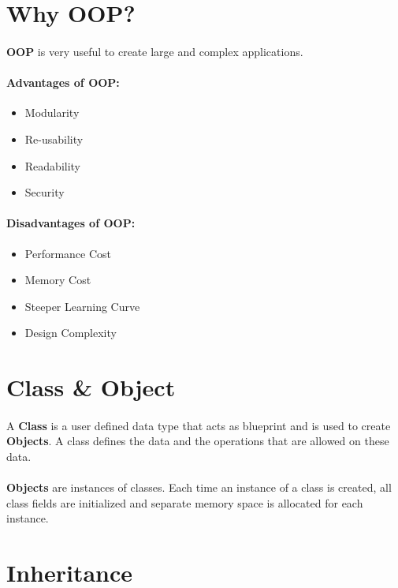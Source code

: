 \documentclass{article}
\begin{document}
\section{Why \acl{OOP}?}
\paragraph{} \textbf{\acf{OOP}} is very useful to create large and complex applications.
\paragraph{Advantages of \acs{OOP}:}
\begin{itemize}
	\item Modularity
	\item Re-usability
	\item Readability
	\item Security
\end{itemize}
\paragraph{Disadvantages of \acs{OOP}:}
\begin{itemize}
	\item Performance Cost
	\item Memory Cost
	\item Steeper Learning Curve
	\item Design Complexity
\end{itemize}


\section{Class \& Object}
\label{sec:class}
\label{sec:object}
\paragraph{} A \textbf{Class} is a user defined data type that acts as blueprint and is used to create \textbf{Objects}. A class defines the data and the operations that are allowed on these data.
\paragraph{} \textbf{Objects} are instances of classes. Each time an instance of a class is created, all class fields are initialized and separate memory space is allocated for each instance.


\section{Inheritance}
\label{sec:inheritance}
\end{document}
